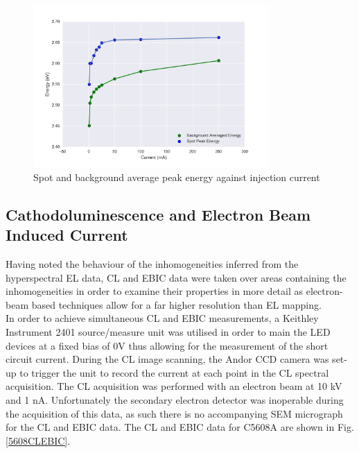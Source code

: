 \begin{figure}[!ht]
	\centering
	\includegraphics[width=0.8\textwidth]{Figs/Ch3/centrePeakcomp5608.png}
	\caption[h] {Spot and background average peak energy against injection current}
	\label{5610centrecomp}
\end{figure}

\FloatBarrier 


\subsection{Cathodoluminescence and Electron Beam Induced Current}
Having noted the behaviour of the inhomogeneities inferred from the hyperspectral EL data, CL and EBIC data were taken over areas containing the inhomogeneities in order to examine their properties in more detail as electron-beam based techniques allow for a far higher resolution than EL mapping.\\
In order to achieve simultaneous CL and EBIC measurements, a Keithley Instrument 2401 source/measure unit was utilised in order to main the LED devices at a fixed bias of 0V thus allowing for the measurement of the short circuit current. During the CL image scanning, the Andor CCD camera was set-up to trigger the unit to record the current at each point in the CL spectral acquisition. The CL acquisition was performed with an electron beam at 10 kV and 1 nA. Unfortunately the secondary electron detector was inoperable during the acquisition of this data, as such there is no accompanying SEM micrograph for the CL and EBIC data. The CL and EBIC data for C5608A are shown in Fig.\ref{5608CLEBIC}.

